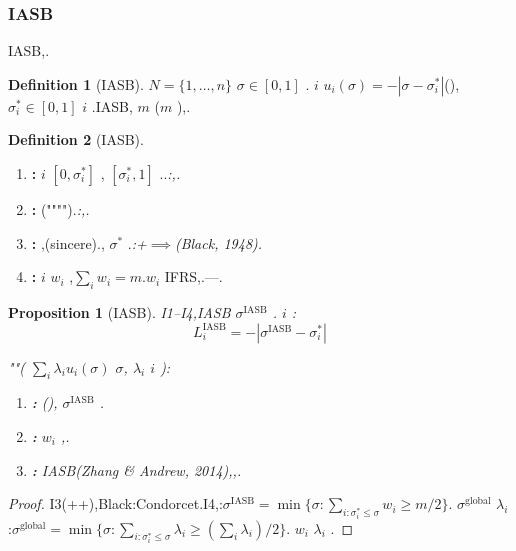 \documentclass[12pt,a4paper]{article}
\newtheorem{proposition}[theorem]{Proposition}
\theoremstyle{definition}
\newtheorem{definition}{Definition}[section]
\theoremstyle{remark}
\begin{document}
\subsubsection{IASB}

IASB,.

\begin{definition}[IASB]
$N = \{1, \ldots, n\}$  $\sigma \in [0,1]$ . $i$  $u_i(\sigma) = -|\sigma - \sigma_i^*|$(), $\sigma_i^* \in [0,1]$  $i$ .IASB, $m$ ($m$ ),.
\end{definition}

\begin{definition}[IASB]
\label{def:iasb-assumptions}
\begin{enumerate}[label=\textbf{I\arabic*}, leftmargin=*, itemsep=4pt]
\item \textbf{:}  $i$  $[0, \sigma_i^*]$ , $[\sigma_i^*, 1]$ ..\hfill\textit{:,.}

\item \textbf{:} ("""").\hfill\textit{:,.}

\item \textbf{:} ,(sincere)., $\sigma^*$ .\hfill\textit{:+$\implies$(Black, 1948).}

\item \textbf{:}  $i$  $w_i$ ,$\sum_i w_i = m$.$w_i$ IFRS,.---.
\end{enumerate}
\end{definition}

\begin{proposition}[IASB]
\label{prop:iasb-bias}
I1--I4,IASB $\sigma^{\text{IASB}}$ . $i$ :
\begin{equation}
L_i^{\text{IASB}} = -|\sigma^{\text{IASB}} - \sigma_i^*|
\end{equation}

""( $\sum_i \lambda_i u_i(\sigma)$  $\sigma$, $\lambda_i$  $i$ ):
\begin{enumerate}[label=(\roman*)]
\item \textbf{:} (), $\sigma^{\text{IASB}}$ .
\item \textbf{:}  $w_i$ ,.
\item \textbf{:} IASB(Zhang \& Andrew, 2014),,.
\end{enumerate}
\end{proposition}

\begin{proof}
I3(++),Black:Condorcet.I4,:$\sigma^{\text{IASB}} = \min\{\sigma : \sum_{i: \sigma_i^* \leq \sigma} w_i \geq m/2\}$. $\sigma^{\text{global}}$  $\lambda_i$ :$\sigma^{\text{global}} = \min\{\sigma : \sum_{i: \sigma_i^* \leq \sigma} \lambda_i \geq (\sum_i \lambda_i)/2\}$. $w_i$  $\lambda_i$ .
\end{proof}
\end{document}
